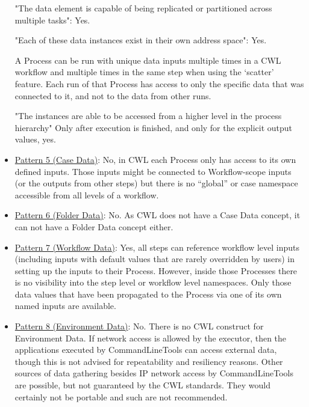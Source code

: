 \begin{itemize}
"The data element is capable of being replicated or partitioned across multiple tasks": Yes.

"Each of these data instances exist in their own address space": Yes.

A Process can be run with unique data inputs multiple times in a CWL workflow and multiple times in the same step when using the ‘scatter’ feature. Each run of that Process has access to only the specific data that was connected to it, and not to the data from other runs.

"The instances are able to be accessed from a higher level in the process hierarchy" Only after execution is finished, and only for the explicit output values, yes.

\item \href{http://www.workflowpatterns.com/patterns/data/visibility/wdp5.php}{Pattern 5 (Case Data)}: No, in CWL each Process only has access to its own defined inputs. Those inputs might be connected to Workflow-scope inputs (or the outputs from other steps) but there is no “global” or case namespace accessible from all levels of a workflow.

\item \href{http://www.workflowpatterns.com/patterns/data/visibility/wdp6.php}{Pattern 6 (Folder Data)}: No. As CWL does not have a Case Data concept, it can not have a Folder Data concept either.

\item \href{http://www.workflowpatterns.com/patterns/data/visibility/wdp7.php}{Pattern 7 (Workflow Data)}: Yes, all steps can reference workflow level inputs (including inputs with default values that are rarely overridden by users) in setting up the inputs to their Process. However, inside those Processes there is no visibility into the step level or workflow level namespaces. Only those data values that have been propagated to the Process via one of its own named inputs are available.

\item \href{http://www.workflowpatterns.com/patterns/data/visibility/wdp8.php}{Pattern 8 (Environment Data)}: No. There is no CWL construct for Environment Data. If network access is allowed by the executor, then the applications executed by CommandLineTools can access external data, though this is not advised for repeatability and resiliency reasons. Other sources of data gathering besides IP network access by CommandLineTools are possible, but not guaranteed by the CWL standards. They would certainly not be portable and such are not recommended.


\end{itemize}
